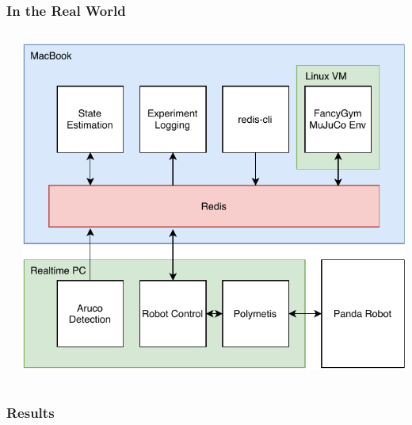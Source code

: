 \documentclass[16:9,en,navbarinfooter]{sdqbeamer}
\begin{document}
\begin{frame}
\frametitle{In the Real World}

\begin{columns}[t]
    \begin{column}{0.3\textwidth}
    \end{column}
    \begin{column}{0.5\textwidth}
        \includegraphics[width=\linewidth]{media/Architecture.pdf}
    \end{column}
\end{columns}
\end{frame}

\begin{frame}
\frametitle{Results}

\begin{columns}[t]
    \begin{column}{0.5\textwidth}
    \end{column}
    \begin{column}{0.5\textwidth}
    \end{column}
\end{columns}
\end{frame}


\appendix
\beginbackup{}
\backupend{}
\end{document}
